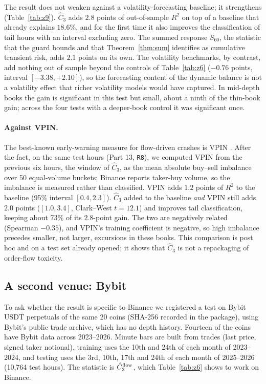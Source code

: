 The result does not weaken against a volatility-forecasting baseline; it strengthens (Table~\ref{tab:z9}). $\hat C_3$ adds $2.8$ points of out-of-sample $R^2$ on top of a baseline that already explains $18.6\%$, and for the first time it also improves the classification of tail hours with an interval excluding zero. The summed response $S_{60}$, the statistic that the guard bounds and that Theorem~\ref{thm:sum} identifies as cumulative transient risk, adds $2.1$ points on its own. The volatility benchmarks, by contrast, add nothing out of sample beyond the controls of Table~\ref{tab:z6} ($-0.76$ points, interval $[-3.38,+2.10]$), so the forecasting content of the dynamic balance is not a volatility effect that richer volatility models would have captured. In mid-depth books the gain is significant in this test but small, about a ninth of the thin-book gain; across the four tests with a deeper-book control it was significant once.

\paragraph{Against VPIN.} The best-known early-warning measure for flow-driven crashes is VPIN \citep{easley2012}. After the fact, on the same test hours (Part 13, \texttt{R8}), we computed VPIN from the previous six hours, the window of $\hat C_3$, as the mean absolute buy--sell imbalance over 50 equal-volume buckets; Binance reports taker-buy volume, so the imbalance is measured rather than classified. VPIN adds $1.2$ points of $R^2$ to the baseline (95\% interval $[0.4,2.3]$). $\hat C_3$ added to the baseline \emph{and} VPIN still adds $2.0$ points ($[1.0,3.4]$, Clark--West $t=12.1$) and improves tail classification, keeping about 73\% of its $2.8$-point gain. The two are negatively related (Spearman $-0.35$), and VPIN's training coefficient is negative, so high imbalance precedes smaller, not larger, excursions in these books. This comparison is post hoc and on a test set already opened; it shows that $\hat C_3$ is not a repackaging of order-flow toxicity.

\subsection{A second venue: Bybit}\label{sec:bybit}
To ask whether the result is specific to Binance we registered a test on Bybit USDT perpetuals of the same 20 coins (SHA-256 recorded in the package), using Bybit's public trade archive, which has no depth history. Fourteen of the coins have Bybit data across 2023--2026. Minute bars are built from trades (last price, signed taker notional), training uses the 10th and 24th of each month of 2023--2024, and testing uses the 3rd, 10th, 17th and 24th of each month of 2025--2026 (10{,}764 test hours). The statistic is $\hat C_3^{\rm flow}$, which Table~\ref{tab:z6} shows to work on Binance.

